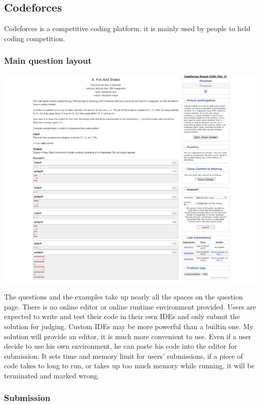 \documentclass[a4paper]{report}
\begin{document}
\subsection{Codeforces}

Codeforces is a competitive coding platform, it is mainly used by people to held coding competition.

\subsubsection{Main question layout}

\includegraphics[width=\linewidth]{Problem-A-Codeforces}

The questions and the examples take up nearly all the spaces on the question page. There is no online editor or online runtime environment provided. Users are expected to write and test their code in their own IDEs and only submit the solution for judging. Custom IDEs may be more powerful than a builtin one. My solution will provide an editor, it is much more convenient to use. Even if a user decide to use his own environment, he can paste his code into the editor for submission. It sets time and memory limit for users' submissions, if a piece of code takes to long to run, or takes up too much memory while running, it will be terminated and marked wrong.

\subsubsection{Submission}
\end{document}
